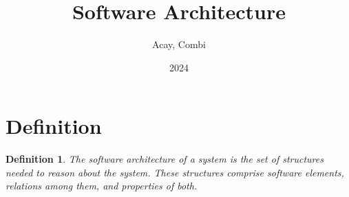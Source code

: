 \documentclass[10pt, oneside]{article}
\title{Software Architecture}
\author{Acay, Combi}
\date{2024}
\newtheorem{defn}{Definition}
\begin{document}
\maketitle
\tableofcontents

\vspace{.25in}

\section{Definition}

\begin{defn}
    The software architecture of a system is the set of structures needed to
reason about the system. These structures comprise software elements,
relations among them, and properties of both.
\end{defn}
\end{document}
